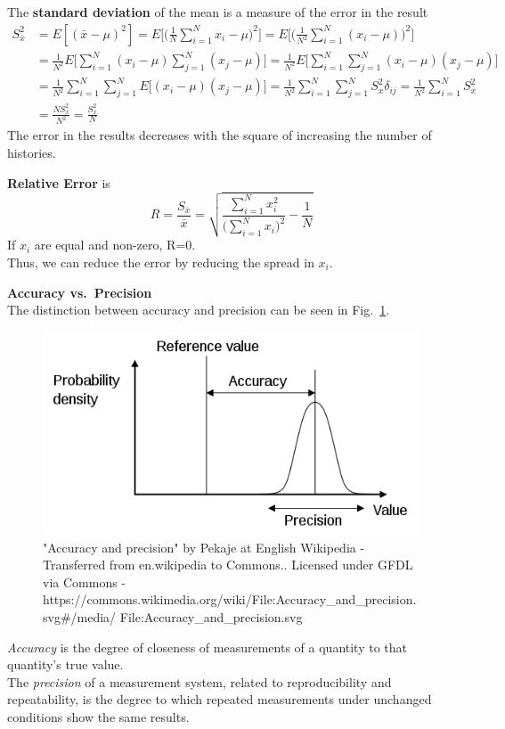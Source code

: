 \documentclass[12pt]{article}
\begin{document}
The \textbf{standard deviation} of the mean is a measure of the error in the result
\begin{align*}
S_{\bar{x}}^2 &= E[(\bar{x} - \mu)^2] = E\biggl[ \biggl(\frac{1}{N}\sum_{i=1}^N x_i - \mu\biggr)^2\biggr] = E\biggl[ \biggl(\frac{1}{N^2}\sum_{i=1}^N (x_i - \mu)\biggr)^2\biggr]\\
%
&=\frac{1}{N^2} E\biggl[ \sum_{i=1}^N (x_i - \mu) \sum_{j=1}^N (x_j - \mu)\biggr] = \frac{1}{N^2} E\biggl[ \sum_{i=1}^N \sum_{j=1}^N (x_i - \mu)  (x_j - \mu)\biggr]\\
%
&= \frac{1}{N^2} \sum_{i=1}^N \sum_{j=1}^N E\bigl[  (x_i - \mu)  (x_j - \mu)\bigr] = \frac{1}{N^2} \sum_{i=1}^N \sum_{j=1}^N S^2_x \delta_{ij} = \frac{1}{N^2} \sum_{i=1}^N S_x^2 \\
%
&= \frac{N S_x^2}{N^2} = \boxed{\frac{S_x^2}{N}}
\end{align*}
The error in the results decreases with the square of increasing the number of histories.

\textbf{Relative Error} is 
\[
R = \frac{S_{\bar{x}}}{\bar{x}} = \sqrt{\frac{\sum_{i=1}^N x_i^2}{\bigl(\sum_{i=1}^N x_i\bigr)^2} - \frac{1}{N}} 
\]
If $x_i$ are equal and non-zero, R=0.\\
Thus, we can reduce the error by reducing the spread in $x_i$.

\textbf{Accuracy vs.\ Precision}\\
The distinction between accuracy and precision can be seen in Fig.~\ref{fig:accuracy}.\\
%
\begin{figure}[h!]
\begin{center}
  \includegraphics[height=2 in,clip]{../figs/accuracy-and-precision}
\end{center}
  \caption{"Accuracy and precision" by Pekaje at English Wikipedia - Transferred from en.wikipedia to Commons.. Licensed under GFDL via Commons - https://commons.wikimedia.org/wiki/File:Accuracy\_and\_precision.svg\#/media/
  File:Accuracy\_and\_precision.svg}
  \label{fig:accuracy}
\end{figure}
%
\textit{Accuracy} is the degree of closeness of measurements of a quantity to that quantity's true value.\\
The \textit{precision} of a measurement system, related to reproducibility and repeatability, is the degree to which repeated measurements under unchanged conditions show the same results.
\end{document}
